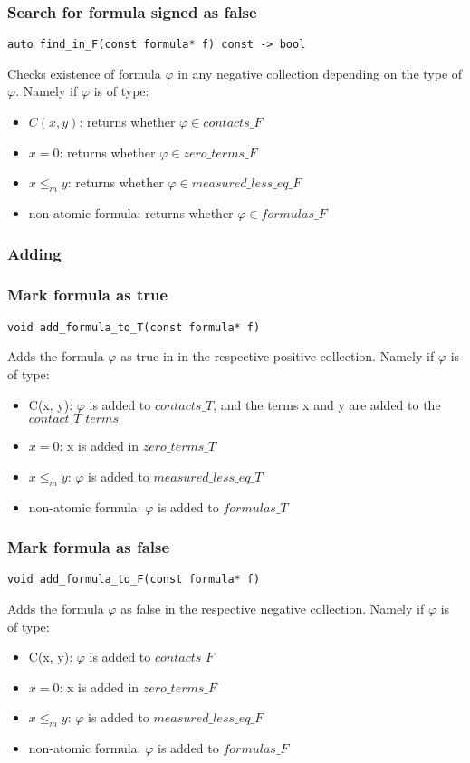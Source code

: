 \documentclass{article}
\begin{document}
	\subsubsection*{Search for formula signed as false}
\begin{lstlisting}
auto find_in_F(const formula* f) const -> bool
\end{lstlisting}
	Checks existence of formula $\varphi$ in any negative collection depending on the type of $\varphi$. Namely if $\varphi$ is of type:
	\begin{itemize}
		\item $C(x, y)$: returns whether $\varphi \in contacts\_F$
		\item $x = 0$: returns whether $\varphi \in zero\_terms\_F$
		\item $x \le_m y$: returns whether $\varphi \in measured\_less\_eq\_F$
		\item non-atomic formula: returns whether $\varphi \in formulas\_F$
	\end{itemize}

	\subsubsection*{Adding}
	\subsubsection*{Mark formula as true}
\begin{lstlisting}
void add_formula_to_T(const formula* f)
\end{lstlisting}
	Adds the formula $\varphi$ as true in in the respective positive collection. Namely if $\varphi$ is of type:
	\begin{itemize}
		\item C(x, y): $\varphi$ is added to $contacts\_T$, and the terms x and y are added to the $contact\_T\_terms\_$
		\item $x = 0$: x is added in $zero\_terms\_T$
		\item $x \le_m y$: $\varphi$ is added to $measured\_less\_eq\_T$
		\item non-atomic formula: $\varphi$ is added to $formulas\_T$
	\end{itemize}

	\subsubsection*{Mark formula as false}
\begin{lstlisting}
void add_formula_to_F(const formula* f)
\end{lstlisting}
	Adds the formula $\varphi$ as false in the respective negative collection. Namely if $\varphi$ is of type:
	\begin{itemize}
		\item C(x, y): $\varphi$ is added to $contacts\_F$
		\item $x = 0$: x is added in $zero\_terms\_F$
		\item $x \le_m y$: $\varphi$ is added to $measured\_less\_eq\_F$
		\item non-atomic formula: $\varphi$ is added to $formulas\_F$
	\end{itemize}
\end{document}
